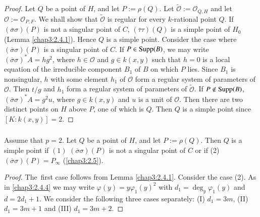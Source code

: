 \begin{proof}
Let $Q$ be a point of $H$, and let $P:=\rho(Q)$. Let
$\widetilde{\mathscr{O}}:=\mathscr{O}_{Q,H}$ and let
$\mathscr{O}:=\mathscr{O}_{P,F}$. We shall show that
$\widetilde{\mathscr{O}}$ is regular for every $k$-rational point
$Q$. If $(\overline{\sigma}\sigma)(P)$ is not a singular point of $C$,
$(\overline{\tau}\tau)(Q)$ is a simple point of $H_{0}$ (\cf Lemma
\ref{chap3:2.4.1}). Hence $Q$ is a simple point. Consider the case where
$(\overline{\sigma}\sigma)(P)$ is a singular point of $C$. If $P\in
\operatorname{Supp}(B)$, we may write $(\overline{\sigma}\sigma)^{\ast}A=hg^{2}$,
where $h\in \mathscr{O}$ and $g\in k(x,y)$ such that $h=0$ is a local
equation of the irreducible component $B_{1}$ of $B$ on which $P$
lies. Since $B_{1}$ is nonsingular, $h$ with some element $h_{1}$ of
$\mathscr{O}$ form a regular system of parameters of
$\mathscr{O}$. Then $t/g$ and $h_{1}$ form a regular system of
parameters of $\widetilde{\mathscr{O}}$. If $P\not\in \operatorname{Supp}(B)$,
$(\overline{\sigma}\sigma)^{\ast}A=g^{2}u$, where $g\in k(x,y)$ and
$u$ is a unit of $\mathscr{O}$. Then there are two distinct points on
$H$ above $P$, one of which is $Q$. Then $Q$ is a simple point since
$[K:k(x,y)]=2$.  
\end{proof}

\subsubsection{}\label{chap3:2.6.2}
\begin{lemma*}
  Assume that $p=2$. Let $Q$ be a point of $H$, and let
  $P:=\rho(Q)$. Then $Q$ is a simple point if $(1)$
  $(\overline{\sigma}\sigma)(P)$ is not a singular point of $C$ or if
  (2) $(\overline{\sigma}\sigma)(P)=P_{\infty}$ (\cf \ref{chap3:2.5}). 
\end{lemma*}

\begin{proof}
The\pageoriginale\ first case follows from Lemma
\ref{chap3:2.4.1}. Consider the case (2). As in \ref{chap3:2.4.4} we may write
$\varphi(y)=y\varphi_{1}(y)^{2}$ with $d_{1}=\deg_{y}\varphi_{1}(y)$
and $d=2d_{1}+1$. We consider the following three cases separately:
(I) $d_{1}=3m$, (II) $d_{1}=3m+1$ and (III) $d_{1}=3m+2$.
\end{proof}

